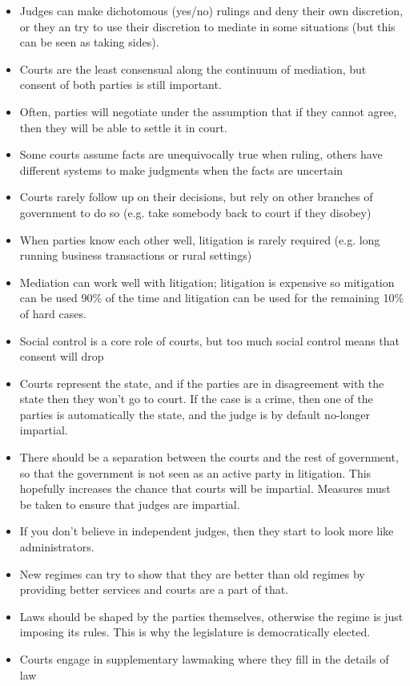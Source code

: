 \documentclass[11pt]{article}
\begin{document}
\begin{itemize}
\item Judges can make dichotomous (yes/no) rulings and deny their own discretion, or
they an try to use their discretion to mediate in some situations (but this
can be seen as taking sides).
\item Courts are the least consensual along the continuum of mediation, but consent
of both parties is still important.
\item Often, parties will negotiate under the assumption that if they cannot agree,
then they will be able to settle it in court.
\item Some courts assume facts are unequivocally true when ruling, others have
different systems to make judgments when the facts are uncertain
\item Courts rarely follow up on their decisions, but rely on other branches of
government to do so (e.g. take somebody back to court if they disobey)
\item When parties know each other well, litigation is rarely required (e.g. long
running business transactions or rural settings)
\item Mediation can work well with litigation; litigation is expensive so mitigation
can be used 90\% of the time and litigation can be used for the remaining 10\%
of hard cases.
\item Social control is a core role of courts, but too much social control means
that consent will drop
\item Courts represent the state, and if the parties are in disagreement with the
state then they won't go to court. If the case is a crime, then one of the
parties is automatically the state, and the judge is by default no-longer
impartial.
\item There should be a separation between the courts and the rest of government, so
that the government is not seen as an active party in litigation. This
hopefully increases the chance that courts will be impartial. Measures must be
taken to ensure that judges are impartial.
\item If you don't believe in independent judges, then they start to look more like
administrators.
\item New regimes can try to show that they are better than old regimes by providing
better services and courts are a part of that.
\item Laws should be shaped by the parties themselves, otherwise the regime is just
imposing its rules. This is why the legislature is democratically elected.
\item Courts engage in supplementary lawmaking where they fill in the details of law

\end{itemize}
\end{document}
